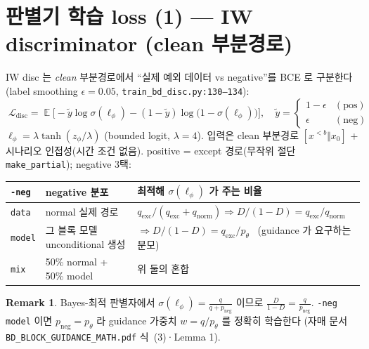 \documentclass[11pt]{article}
\newcommand{\code}[1]{\texttt{\small #1}}
\newcommand{\pth}{p_\theta}
\newcommand{\xpre}{x^{<b}}
\DeclareMathOperator*{\E}{\mathbb{E}}
\theoremstyle{definition}
\newtheorem{remark}{Remark}
\begin{document}
\section{판별기 학습 loss (1) — IW discriminator (clean 부분경로)}
IW disc 는 \emph{clean} 부분경로에서 ``실제 예외 데이터 vs negative''를 BCE 로 구분한다
(label smoothing $\epsilon{=}0.05$, \code{train\_bd\_disc.py:130--134}):
\begin{equation}
\boxed{\;\mathcal L_{\text{disc}}=\E\big[-\tilde y\log\sigma(\ell_\phi)-(1-\tilde y)\log\big(1-\sigma(\ell_\phi)\big)\big],\quad
\tilde y=\begin{cases}1-\epsilon&(\text{pos})\\ \epsilon&(\text{neg})\end{cases}\;}
\end{equation}
$\ell_\phi=\lambda\tanh(z_\phi/\lambda)$ (bounded logit, $\lambda{=}4$). 입력은
clean 부분경로 $[\xpre\Vert x_0]$ + 시나리오 인접성(시간 조건 없음).
positive = except 경로(무작위 절단 \code{make\_partial}); negative 3택:
\begin{center}\small
\begin{tabular}{@{}l l l@{}}
\toprule
\code{-neg} & negative 분포 & 최적해 $\sigma(\ell_\phi)$ 가 주는 비율\\
\midrule
\code{data} & normal 실제 경로 & $q_{\text{exc}}/(q_{\text{exc}}{+}q_{\text{norm}})\Rightarrow D/(1{-}D){=}q_{\text{exc}}/q_{\text{norm}}$\\
\code{model}& 그 블록 모델 unconditional 생성 & $\Rightarrow D/(1{-}D){=}q_{\text{exc}}/\pth$ \ (guidance 가 요구하는 분모)\\
\code{mix} & 50\% normal + 50\% model & 위 둘의 혼합\\
\bottomrule
\end{tabular}
\end{center}
\begin{remark}
Bayes-최적 판별자에서 $\sigma(\ell_\phi)=\frac{q}{q+p_{\text{neg}}}$ 이므로 $\frac{D}{1-D}=\frac{q}{p_{\text{neg}}}$.
\code{-neg model} 이면 $p_{\text{neg}}=\pth$ 라 guidance 가중치 $w=q/\pth$ 를 정확히 학습한다
(자매 문서 \code{BD\_BLOCK\_GUIDANCE\_MATH.pdf} 식~(3)·Lemma 1).
\end{remark}
\end{document}
